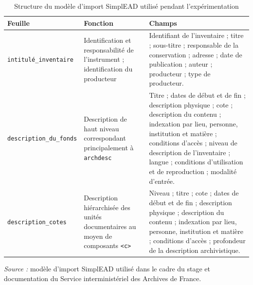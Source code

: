 \begin{table}[htbp]
	\centering
	\scriptsize
	\setlength{\tabcolsep}{4pt}
	\renewcommand{\arraystretch}{1.15}
	\caption{Structure du modèle d'import SimplEAD utilisé pendant l'expérimentation}
	\label{tab:structure-simplead}
	
	\begin{tabularx}{\textwidth}{
			>{\raggedright\arraybackslash}p{2.7cm}
			>{\raggedright\arraybackslash}p{3.1cm}
			>{\raggedright\arraybackslash}X
		}
		\toprule
		\textbf{Feuille} &
		\textbf{Fonction} &
		\textbf{Champs} \\
		\midrule
		
		\texttt{intitulé\_inventaire} &
		Identification et responsabilité de l'instrument ; identification du producteur &
		Identifiant de l'inventaire ; titre ; sous-titre ; responsable de la conservation ; adresse ; date de publication ; auteur ; producteur ; type de producteur. \\
		
		\addlinespace
		
		\texttt{description\_du\_fonds} &
		Description de haut niveau correspondant principalement à \texttt{archdesc} &
		Titre ; dates de début et de fin ; description physique ; cote ; description du contenu ; indexation par lieu, personne, institution et matière ; conditions d'accès ; niveau de description de l'inventaire ; langue ; conditions d'utilisation et de reproduction ; modalité d'entrée. \\
		
		\addlinespace
		
		\texttt{description\_cotes} &
		Description hiérarchisée des unités documentaires au moyen de composants \texttt{<c>} &
		Niveau ; titre ; cote ; dates de début et de fin ; description physique ; description du contenu ; indexation par lieu, personne, institution et matière ; conditions d'accès ; profondeur de la description archivistique. \\
		
		\bottomrule
	\end{tabularx}
	
	\vspace{0.3em}
	
	\begin{minipage}{0.95\textwidth}
		\footnotesize
		\emph{Source :} modèle d'import SimplEAD utilisé dans le cadre du stage et documentation du Service interministériel des Archives de France.
	\end{minipage}
\end{table}

